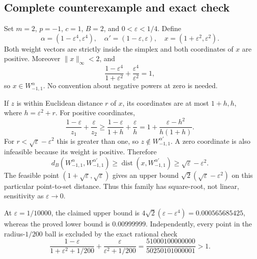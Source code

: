 \documentclass[10pt]{article}
\begin{document}
\subsection*{Complete counterexample and exact check}
Set \(m=2\), \(p=-1\), \(c=1\), \(B=2\), and \(0<\varepsilon<1/4\). Define \[\alpha=(1-\varepsilon^4,\varepsilon^4),\quad
 \alpha'=(1-\varepsilon,\varepsilon),\quad
 x=(1+\varepsilon^2,\varepsilon^2).\] Both weight vectors are strictly inside the simplex and both coordinates of \(x\) are positive. Moreover \(\|x\|_\infty<2\), and \[\frac{1-\varepsilon^4}{1+\varepsilon^2}
 +\frac{\varepsilon^4}{\varepsilon^2}=1,\] so \(x\in W^\alpha_{-1,1}\). No convention about negative powers at zero is needed.\par
If \(z\) is within Euclidean distance \(r\) of \(x\), its coordinates are at most \(1+h,h\), where \(h=\varepsilon^2+r\). For positive coordinates, \[\frac{1-\varepsilon}{z_1}+\frac{\varepsilon}{z_2}
 \ge \frac{1-\varepsilon}{1+h}+\frac{\varepsilon}{h}
 =1+\frac{\varepsilon-h^2}{h(1+h)}.\] For \(r<\sqrt\varepsilon-\varepsilon^2\) this is greater than one, so \(z\notin W^{\alpha'}_{-1,1}\). A zero coordinate is also infeasible because its weight is positive. Therefore \[d_B(W^\alpha_{-1,1},W^{\alpha'}_{-1,1})
 \ge\operatorname{dist}(x,W^{\alpha'}_{-1,1})
 \ge\sqrt\varepsilon-\varepsilon^2 .\] The feasible point \((1+\sqrt\varepsilon,\sqrt\varepsilon)\) gives an upper bound \(\sqrt2(\sqrt\varepsilon-\varepsilon^2)\) on this particular point-to-set distance. Thus this family has square-root, not linear, sensitivity as \(\varepsilon\to0\).\par
At \(\varepsilon=1/10000\), the claimed upper bound is \(4\sqrt2(\varepsilon-\varepsilon^4)=0.000565685425\), whereas the proved lower bound is \(0.00999999\). Independently, every point in the radius-\(1/200\) ball is excluded by the exact rational check \[\frac{1-\varepsilon}{1+\varepsilon^2+1/200}
 +\frac{\varepsilon}{\varepsilon^2+1/200}
 =\frac{51000100000000}{50250101000001}>1.\]\par
\end{document}

